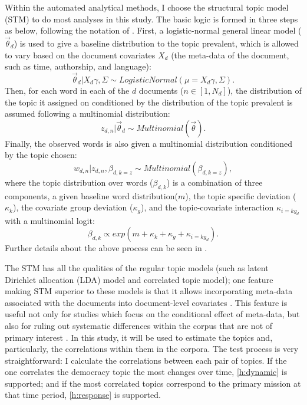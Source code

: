 \documentclass[abstracton,UTF8]{ctexart}
\begin{document}
Within the automated analytical methods, I choose the structural topic model (STM) to do most analyses in this study. The basic logic is formed in three steps as below, following the notation of \cite{Roberts2014a}. First, a logistic-normal general linear model ($\vec{\theta}_d$) is used to give a baseline distribution to the topic prevalent, which is allowed to vary based on the document covariates $X_d$ (the meta-data of the document, such as time, authorship, and language):
\begin{equation*}
\vec{\theta}_d | X_d\gamma, \Sigma \sim LogisticNormal(\mu =  X_d\gamma, \Sigma). 
\end{equation*} Then, for each word in each of the $d$ documents ($n \in [1, N_d]$), the distribution of the topic it assigned on conditioned by the distribution of the topic prevalent is assumed following a multinomial distribution: 
\begin{equation*}
z_{d,n} | \vec{\theta}_d \sim Multinomial(\vec{\theta}).
\end{equation*}
Finally, the observed words is also given a multinomial distribution conditioned by the topic chosen: 
\begin{equation*}
w_{d,n} | z_{d,n}, \beta_{d,k = z} \sim Multinomial(\beta_{d,k = z}), 
\end{equation*} where the topic distribution over words ($\beta_{d,k}$) is a combination of three components, a given baseline word distribution($ m $), the topic specific deviation ($\kappa_k$), the covariate group deviation ($\kappa_g$), and the topic-covariate interaction $\kappa_{i = kg_d}$ with a multinomial logit:
\begin{equation*}
\beta_{d,k} \varpropto exp(m + \kappa_k + \kappa_g + \kappa_{i = kg_d}). 
\end{equation*} Further details about the above process can be seen in \citep{Lucas2015,Roberts2014,Roberts2013}. 

The STM has all the qualities of the regular topic models (such as latent Dirichlet allocation (LDA) model and correlated topic model); one feature making STM superior to these models is that it allows incorporating meta-data associated with the documents into document-level covariates \citep{Lucas2015}. This feature is useful not only for studies which focus on the conditional effect of meta-data, but also for ruling out systematic differences within the corpus that are not of primary interest \citep[10]{Lucas2015}. In this study, it will be used to estimate the topics and, particularly, the correlations within them in the corpora. The test process is very straightforward: I calculate the correlations between each pair of topics. If the one correlates the democracy topic the most changes over time, \ref{h:dynamic} is supported; and if the most correlated topics correspond to the primary mission at that time period, \ref{h:response} is supported.
\end{document}

